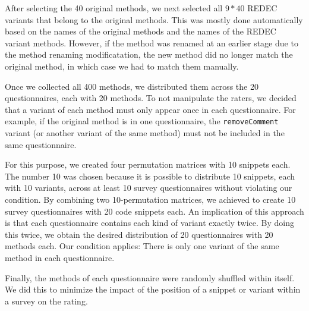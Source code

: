 \documentclass[%
class=scrreprt,
chapterprefix=false,%
open=right,%
twoside=false,%
paper=a4,%
logofile={Logo\_zentral\_farbig\_EN.png},%
thesistype=master,%
UKenglish,%
]{se2thesis}
\theoremstyle{definition}
\newcommand{\mod}{modificatation\xspace}
\newcommand{\rdh}{REDEC\xspace}
\begin{document}
	After selecting the 40 original methods, we next selected all $9*40$ \rdh variants that belong to the original methods. This was mostly done automatically based on the names of the original methods and the names of the \rdh variant methods. However, if the method was renamed at an earlier stage due to the method renaming \mod, the new method did no longer match the original method, in which case we had to match them manually.
		
	Once we collected all 400 methods, we distributed them across the 20 questionnaires, each with 20 methods. To not manipulate the raters, we decided that a variant of each method must only appear once in each questionnaire. For example, if the original method is in one questionnaire, the \texttt{removeComment} variant (or another variant of the same method) must not be included in the same questionnaire.
		
	For this purpose, we created four permutation matrices with 10 snippets each. The number 10 was chosen because it is possible to distribute 10 snippets, each with 10 variants, across at least 10 survey questionnaires without violating our condition. By combining two 10-permutation matrices, we achieved to create 10 survey questionnaires with 20 code snippets each. An implication of this approach is that each questionnaire contains each kind of variant exactly twice. By doing this twice, we obtain the desired distribution of 20 questionnaires with 20 methods each. Our condition applies: There is only one variant of the same method in each questionnaire.
		
	Finally, the methods of each questionnaire were randomly shuffled within itself. We did this to minimize the impact of the position of a snippet or variant within a survey on the rating.

	
\end{document}
